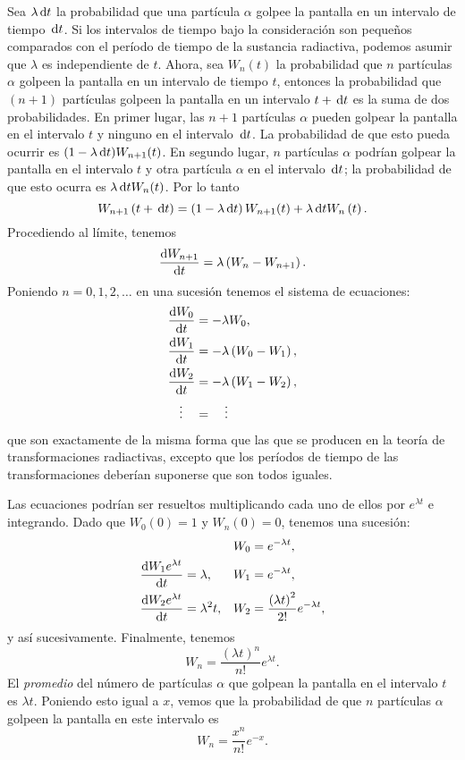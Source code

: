 	Sea $\lambda\dl t$ la probabilidad que una partícula $\alpha$ golpee la pantalla en un intervalo de tiempo $\dl t$. Si los intervalos de tiempo bajo la consideración son pequeños comparados con el período de tiempo de la sustancia radiactiva, podemos asumir que $\lambda$ es independiente de $t$. Ahora, sea $W_n(t)$ la probabilidad que $n$ partículas $\alpha$ golpeen la pantalla en un intervalo de tiempo $t$, entonces la probabilidad que $(n+1)$ partículas golpeen la pantalla en un intervalo $t+\dl t$ es la suma de dos probabilidades. En primer lugar, las $n+1$ partículas $\alpha$ pueden golpear la pantalla en el intervalo $t$ y ninguno en el intervalo $\dl t$. La probabilidad de que esto pueda ocurrir es $(1-\lambda\dl t)W_{n+1}(t)$. En segundo lugar, $n$ partículas $\alpha$ podrían golpear la pantalla en el intervalo $t$ y otra partícula $\alpha$ en el intervalo $\dl t$; la probabilidad de que esto ocurra es $\lambda\dl t W_n(t)$. Por lo tanto
	\[
		W_{n+1}\left(t+\dl t\right)=\left(1-\lambda\dl t\right)W_{n+1}(t)+\lambda\dl t W_n\left(t\right).
	\]
	Procediendo al límite, tenemos
	\[
		\diff{W_{n+1}}{t}=\lambda\left(W_n-W_{n+1}\right).
	\]
	Poniendo $n=0,1,2,\ldots$ en una sucesión tenemos el sistema de ecuaciones:
	\begin{align*}
		\diff{W_0}{t}&=-\lambda W_0,\\
		\diff{W_1}{t}&=-\lambda\left(W_0-W_1\right),\\
		\diff{W_2}{t}&=-\lambda\left(W_1-W_2\right),\\
		\vdots\quad &=\quad\vdots\\
	\end{align*}
	que son exactamente de la misma forma que las que se producen en la teoría de transformaciones radiactivas, excepto que los períodos de tiempo de las transformaciones deberían suponerse que son todos iguales.

	Las ecuaciones podrían ser resueltos multiplicando cada uno de ellos por $e^{\lambda t}$ e integrando. Dado que $W_0(0)=1$ y $W_n(0)=0$, tenemos una sucesión:
	\begin{align*}
		&& W_0&= e^{-\lambda t},\\
		\diff{W_1e^{\lambda t}}{t}&=\lambda, & W_1&= e^{-\lambda t},\\
		\diff{W_2e^{\lambda t}}{t}&=\lambda^2t, & W_2&=\frac{{\left(\lambda t\right)}^2}{2!}e^{-\lambda t},\\
	\end{align*}
	y así sucesivamente. Finalmente, tenemos
	\[
		W_n=\frac{{\left(\lambda t\right)}^n}{n!}e^{\lambda t}.
	\]
	El \emph{promedio} del número de  partículas $\alpha$ que golpean la pantalla en el intervalo $t$ es $\lambda t$. Poniendo esto igual a $x$, vemos que la probabilidad de que $n$ partículas $\alpha$ golpeen la pantalla en este intervalo es
	\[
		W_n=\frac{x^n}{n!}e^{-x}.
	\]

